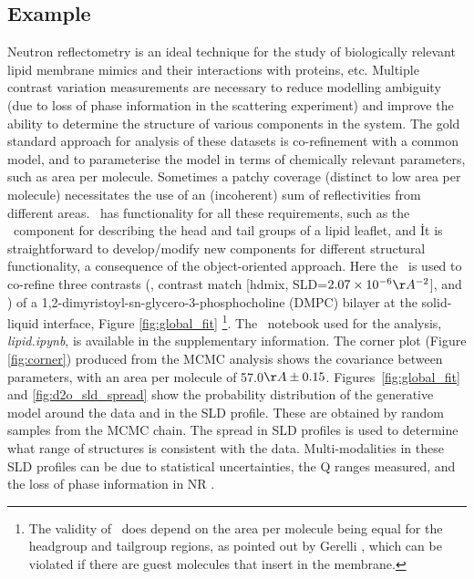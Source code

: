 \documentclass[12pt]{article}
\begin{document}
\subsection*{Example}
Neutron reflectometry is an ideal technique for the study of biologically relevant lipid membrane mimics and their interactions with proteins, etc. Multiple contrast variation measurements are necessary to reduce modelling ambiguity (due to loss of phase information in the scattering experiment) and improve the ability to determine the structure of various components in the system. The gold standard approach for analysis of these datasets is co-refinement with a common model, and to parameterise the model in terms of chemically relevant parameters, such as area per molecule. Sometimes a patchy coverage (distinct to low area per molecule) necessitates the use of an (incoherent) sum of reflectivities from different areas. \ has functionality for all these requirements, such as the \LipidLeaflet\ component for describing the head and tail groups of a lipid leaflet, and \MixedReflectModel\. It is straightforward to develop/modify new components for different structural functionality, a consequence of the object-oriented approach. Here the \LipidLeaflet\ is used to co-refine three contrasts (,  contrast match [hdmix, SLD=$2.07\times10^{-6}\AA^{-2}$], and ) of a 1,2-dimyristoyl-sn-glycero-3-phosphocholine (DMPC) bilayer at the solid-liquid interface, Figure \ref{fig:global_fit} \footnote{The validity of \LipidLeaflet\ does depend on the area per molecule being equal for the headgroup and tailgroup regions, as pointed out by Gerelli \cite{Gerelli2016}, which can be violated if there are guest molecules that insert in the membrane.}. The \Jupyter\ notebook used for the analysis, \emph{lipid.ipynb}, is available in the supplementary information. The corner plot (Figure \ref{fig:corner}) produced from the MCMC analysis shows the covariance between parameters, with an area per molecule of 57.0$\AA\pm0.15$. Figures~\ref{fig:global_fit} and \ref{fig:d2o_sld_spread} show the probability distribution of the generative model around the data and in the SLD profile. These are obtained by random samples from the MCMC chain. The spread in SLD profiles is used to determine what range of structures is consistent with the data. Multi-modalities in these SLD profiles can be due to statistical uncertainties, the Q ranges measured, and the loss of phase information in NR \cite{Majkrzak1999, Heinrich2009}.
\end{document}
